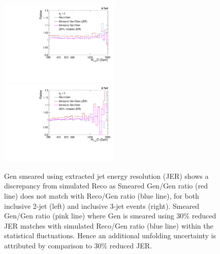 \begin{figure}[!htbp]
 \begin{center}
 \includegraphics[width=0.51\textwidth]{Plots_HT_2_150/Ratio_Reco_2_crystal.pdf}%
 ~~\includegraphics[width=0.51\textwidth]{Plots_HT_2_150/Ratio_Reco_3_crystal.pdf}\\
 \caption{\MadGraphF \plus \PYTHIAS Gen smeared using extracted jet energy resolution (JER) shows a discrepancy from simulated Reco as Smeared Gen/Gen ratio (red line) does not match with Reco/Gen ratio (blue line), for both inclusive 2-jet (left) and inclusive 3-jet events (right). Smeared Gen/Gen ratio (pink line) where Gen is smeared using 30\% reduced JER matches with simulated Reco/Gen ratio (blue line) within the statistical fluctuations. Hence an additional unfolding uncertainty is attributed by comparison to 30\% reduced JER.}
 \label{fig:ratios}
 \end{center}
\end{figure}

